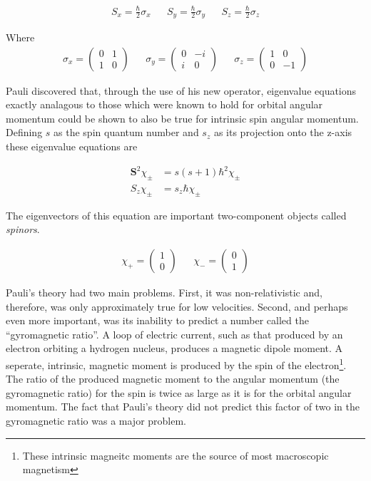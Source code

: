 \documentclass[12pt]{book}
\begin{document}
\begin{align}
S_{x}=\frac{\hbar}{2}\sigma_{x} &&
S_{y}=\frac{\hbar}{2} \sigma_{y} &&
S_{z}=\frac{\hbar}{2} \sigma_{z}
\end{align}

Where
\begin{align}
\sigma_{x}=\left( \begin{array}{cc}
0 & 1 \\
1 & 0 \end{array} \right) &&
\sigma_{y}=\left( \begin{array}{cc}
0 & -i \\
i & 0 \end{array} \right) &&
\sigma_{z}=\left( \begin{array}{cc}
1 & 0 \\
0 & -1 \end{array} \right)
\end{align}

Pauli discovered that, through the use of his new operator, eigenvalue equations exactly analagous to those which were known to hold for orbital angular momentum could be shown to also be true for intrinsic spin angular momentum. Defining $s$ as the spin quantum number and $s_{z}$ as its projection onto the z-axis these eigenvalue equations are

\begin{subequations}\label{grp2}
\begin{align}
\mathbf{S}^{2}\chi_{\pm}&=s(s+1)\hbar^{2}\chi_{\pm}\label{third}\\
S_{z}\chi_{\pm}&=s_{z}\hbar \chi_{\pm} \label{fourth}
\end{align}
\end{subequations}

The eigenvectors of this equation are important two-component objects called \textit{spinors}.

\begin{align}
\chi_{+}=
\left( \begin{array}{c}
1 \\
0 \end{array} \right)&&
\chi_{-}=
\left( \begin{array}{c}
0 \\
1 \end{array} \right)
\end{align}

Pauli's theory had two main problems. First, it was non-relativistic and, therefore, was only approximately true for low velocities. Second, and perhaps even more important, was its inability to predict a number called the ``gyromagnetic ratio''. A loop of electric current, such as that produced by an electron orbiting a hydrogen nucleus, produces a magnetic dipole moment. A seperate, intrinsic, magnetic moment is  produced by the spin of the electron\footnote{These intrinsic magneitc moments are  the source of most macroscopic magnetism}. The ratio of the produced magnetic moment to the angular momentum (the gyromagnetic ratio) for the spin is twice as large as it is for the orbital angular momentum. The fact that Pauli's theory did not predict this factor of two in the gyromagnetic ratio was a major problem.
\end{document}
